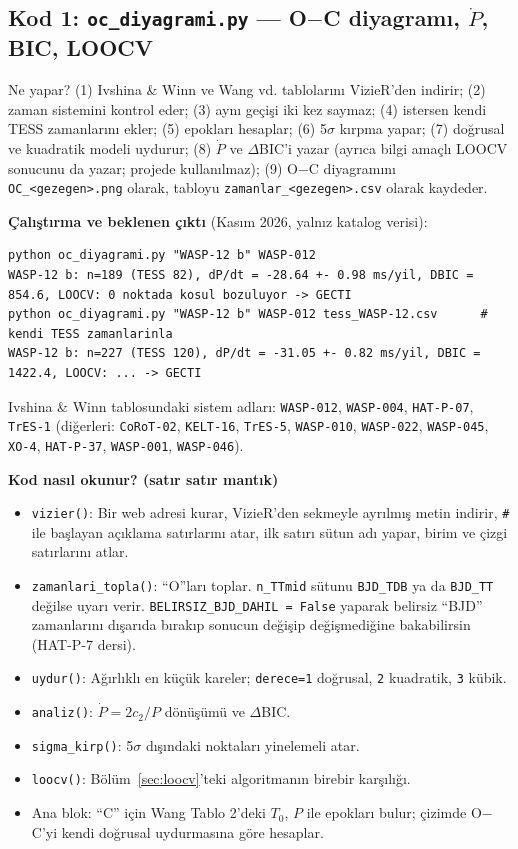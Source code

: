 \subsection{Kod 1: \texttt{oc\_diyagrami.py} — O$-$C diyagramı, $\dot P$, BIC, LOOCV}
Ne yapar? (1) Ivshina \& Winn ve Wang vd. tablolarını VizieR'den indirir; (2) zaman sistemini kontrol eder;
(3) aynı geçişi iki kez saymaz; (4) istersen kendi TESS zamanlarını ekler; (5) epokları hesaplar; (6) 5$\sigma$ kırpma
yapar; (7) doğrusal ve kuadratik modeli uydurur; (8) $\dot P$ ve $\Delta$BIC'i yazar (ayrıca bilgi amaçlı LOOCV sonucunu da yazar; projede kullanılmaz); (9) O$-$C
diyagramını \texttt{OC\_<gezegen>.png} olarak, tabloyu \texttt{zamanlar\_<gezegen>.csv} olarak kaydeder.


\textbf{Çalıştırma ve beklenen çıktı} (Kasım 2026, yalnız katalog verisi):
\begin{lstlisting}[style=kabuk]
python oc_diyagrami.py "WASP-12 b" WASP-012
WASP-12 b: n=189 (TESS 82), dP/dt = -28.64 +- 0.98 ms/yil, DBIC = 854.6, LOOCV: 0 noktada kosul bozuluyor -> GECTI
python oc_diyagrami.py "WASP-12 b" WASP-012 tess_WASP-12.csv      # kendi TESS zamanlarinla
WASP-12 b: n=227 (TESS 120), dP/dt = -31.05 +- 0.82 ms/yil, DBIC = 1422.4, LOOCV: ... -> GECTI
\end{lstlisting}
Ivshina \& Winn tablosundaki sistem adları: \texttt{WASP-012}, \texttt{WASP-004}, \texttt{HAT-P-07}, \texttt{TrES-1}
(diğerleri: \texttt{CoRoT-02}, \texttt{KELT-16}, \texttt{TrES-5}, \texttt{WASP-010}, \texttt{WASP-022},
\texttt{WASP-045}, \texttt{XO-4}, \texttt{HAT-P-37}, \texttt{WASP-001}, \texttt{WASP-046}).

\textbf{Kod nasıl okunur? (satır satır mantık)}
\begin{itemize}[leftmargin=*]
\item \texttt{vizier()}: Bir web adresi kurar, VizieR'den sekmeyle ayrılmış metin indirir, \texttt{\#} ile başlayan
      açıklama satırlarını atar, ilk satırı sütun adı yapar, birim ve çizgi satırlarını atlar.
\item \texttt{zamanlari\_topla()}: “O”ları toplar. \texttt{n\_TTmid} sütunu \texttt{BJD\_TDB} ya da \texttt{BJD\_TT}
      değilse uyarı verir. \texttt{BELIRSIZ\_BJD\_DAHIL = False} yaparak belirsiz “BJD” zamanlarını dışarıda bırakıp
      sonucun değişip değişmediğine bakabilirsin (HAT-P-7 dersi).
\item \texttt{uydur()}: Ağırlıklı en küçük kareler; \texttt{derece=1} doğrusal, \texttt{2} kuadratik, \texttt{3} kübik.
\item \texttt{analiz()}: $\dot P = 2c_2/P$ dönüşümü ve $\Delta$BIC.
\item \texttt{sigma\_kirp()}: 5$\sigma$ dışındaki noktaları yinelemeli atar.
\item \texttt{loocv()}: Bölüm~\ref{sec:loocv}'teki algoritmanın birebir karşılığı.
\item Ana blok: “C” için Wang Tablo 2'deki $T_0$, $P$ ile epokları bulur; çizimde O$-$C'yi kendi doğrusal
      uydurmasına göre hesaplar.
\end{itemize}

